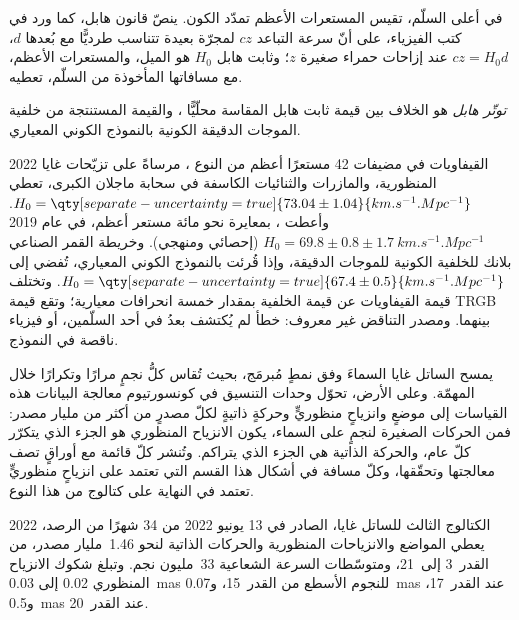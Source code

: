 في أعلى السلّم، تقيس المستعرات الأعظم تمدّد
الكون. ينصّ قانون هابل، كما ورد في كتب الفيزياء، على أنّ سرعة
التباعد $cz$ لمجرّة بعيدة تتناسب طرديًّا مع بُعدها $d$،
$cz = H_0 d$ عند إزاحات حمراء صغيرة $z$؛ وثابت هابل $H_0$ هو
الميل، والمستعرات الأعظم، مع مسافاتها المأخوذة من السلّم، تعطيه.

\begin{definition}\label{def:b3:milky-way-galaxies:tension}
\emph{توتّر هابل} هو الخلاف
بين قيمة ثابت هابل المقاسة محلّيًّا ،
والقيمة المستنتجة من خلفية الموجات الدقيقة الكونية
بالنموذج الكوني المعياري.
\end{definition}

\begin{dated}{2022}
القيفاويات في مضيفات 42 مستعرًا أعظم من النوع ، مرساةً على تزيّحات غايا المنظورية،
والمازرات  والثنائيات الكاسفة في
سحابة ماجلان الكبرى، تعطي
$H_0 = \qty[separate-uncertainty=true]{73.04 \pm 1.04}{km.s^{-1}.Mpc^{-1}}$.
وأعطت ، بمعايرة نحو مائة مستعر أعظم،
في عام 2019 $H_0 = 69.8 \pm 0.8 \pm \qty{1.7}{km.s^{-1}.Mpc^{-1}}$
(إحصائي ومنهجي). وخريطة القمر الصناعي بلانك للخلفية
الكونية للموجات الدقيقة، وإذا قُرئت بالنموذج الكوني المعياري، تُفضي إلى
$H_0 = \qty[separate-uncertainty=true]{67.4 \pm 0.5}{km.s^{-1}.Mpc^{-1}}$.
وتختلف قيمة القيفاويات عن قيمة الخلفية بمقدار خمسة انحرافات
معيارية؛ وتقع قيمة TRGB بينهما. ومصدر
التناقض غير معروف: خطأ لم يُكتشف بعدُ في أحد السلّمين،
أو فيزياء ناقصة في النموذج.
\end{dated}

\begin{inthelab}
يمسح الساتل غايا السماءَ وفق نمطٍ مُبرمَج، بحيث تُقاس كلُّ
نجمٍ مرارًا وتكرارًا خلال المهمّة. وعلى الأرض، تحوّل وحدات التنسيق في
كونسورتيوم معالجة البيانات هذه القياسات إلى موضعٍ وانزياحٍ منظوريٍّ وحركةٍ ذاتيةٍ لكلّ
مصدرٍ من أكثر من مليار مصدر: فمن الحركات الصغيرة لنجمٍ على السماء،
يكون الانزياح المنظوري هو الجزء الذي يتكرّر كلّ عام،
والحركة الذاتية هي الجزء الذي يتراكم. وتُنشر كلّ قائمة مع أوراقٍ
تصف معالجتها وتحقّقها، وكلّ مسافة في أشكال هذا القسم
التي تعتمد على انزياحٍ منظوريٍّ
تعتمد في النهاية على
كتالوج من هذا النوع.
\end{inthelab}

\begin{dated}{2022}
الكتالوج الثالث للساتل غايا، الصادر في 13 يونيو 2022 من 34 شهرًا من
الرصد، يعطي المواضع والانزياحات المنظورية والحركات الذاتية لنحو
1.46~مليار مصدر، من القدر~3 إلى~21، ومتوسّطات السرعة الشعاعية
33~مليون نجم. وتبلغ شكوك الانزياح المنظوري 0.02 إلى
\qty{0.03}{mas} للنجوم الأسطع من القدر~15، و\qty{0.07}{mas} عند
القدر~17، و\qty{0.5}{mas} عند القدر~20.
\end{dated}

